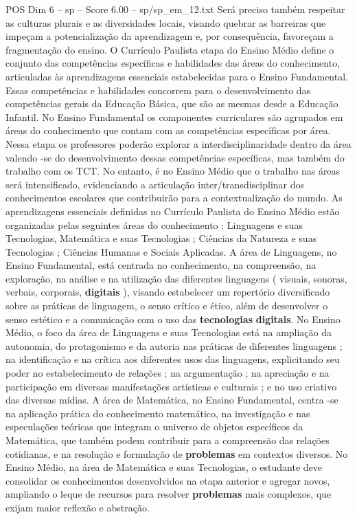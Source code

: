 \begin{textsample}{POS Dim 6 – sp – Score 6.00 – sp/sp\_em\_12.txt}
Será preciso também respeitar as culturas plurais e as diversidades locais, visando quebrar as barreiras que impeçam a potencialização da aprendizagem e, por consequência, favoreçam a fragmentação do ensino.
O Currículo Paulista etapa do Ensino Médio define o conjunto das competências específicas e habilidades das áreas do conhecimento, articuladas às aprendizagens essenciais estabelecidas para o Ensino Fundamental.
Essas competências e habilidades concorrem para o desenvolvimento das competências gerais da Educação Básica, que são as mesmas desde a Educação Infantil.
No Ensino Fundamental os componentes curriculares são agrupados em áreas do conhecimento que contam com as competências específicas por área.
Nessa etapa os professores poderão explorar a interdisciplinaridade dentro da área valendo -se do desenvolvimento dessas competências específicas, mas também do trabalho com os TCT.
No entanto, é no Ensino Médio que o trabalho nas áreas será intensificado, evidenciando a articulação inter/transdisciplinar dos conhecimentos escolares que contribuirão para a contextualização do mundo.
As aprendizagens essenciais definidas no Currículo Paulista do Ensino Médio estão organizadas pelas seguintes áreas do conhecimento : Linguagens e suas Tecnologias, Matemática e suas Tecnologias ; Ciências da Natureza e suas Tecnologias ; Ciências Humanas e Sociais Aplicadas.
A área de Linguagens, no Ensino Fundamental, está centrada no conhecimento, na compreensão, na exploração, na análise e na utilização das diferentes linguagens ( visuais, sonoras, verbais, corporais, \textbf{digitais} ), visando estabelecer um repertório diversificado sobre as práticas de linguagem, o senso crítico e ético, além de desenvolver o senso estético e a comunicação com o uso das \textbf{tecnologias} \textbf{digitais}.
No Ensino Médio, o foco da área de Linguagens e suas Tecnologias está na ampliação da autonomia, do protagonismo e da autoria nas práticas de diferentes linguagens ; na identificação e na crítica aos diferentes usos das linguagens, explicitando seu poder no estabelecimento de relações ; na argumentação ; na apreciação e na participação em diversas manifestações artísticas e culturais ; e no uso criativo das diversas mídias.
A área de Matemática, no Ensino Fundamental, centra -se na aplicação prática do conhecimento matemático, na investigação e nas especulações teóricas que integram o universo de objetos específicos da Matemática, que também podem contribuir para a compreensão das relações cotidianas, e na resolução e formulação de \textbf{problemas} em contextos diversos.
No Ensino Médio, na área de Matemática e suas Tecnologias, o estudante deve consolidar os conhecimentos desenvolvidos na etapa anterior e agregar novos, ampliando o leque de recursos para resolver \textbf{problemas} mais complexos, que exijam maior reflexão e abstração.

\end{textsample}
